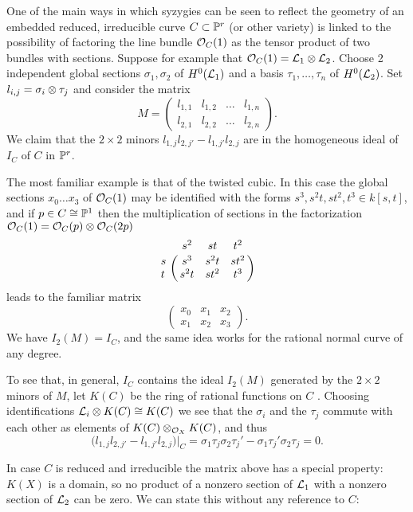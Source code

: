 One of the main ways in which syzygies can be seen to reflect the geometry of an embedded  reduced, irreducible curve $C\subset {\mathbb P}^r$
(or other variety) is linked to the possibility of factoring the line bundle ${\mathcal O}_C(1)$ as the tensor product of two bundles with sections. Suppose for example that ${\mathcal O}_C(1) = {\mathcal L}_1\otimes {\mathcal L}_2$. Choose 2 independent global sections
$\sigma_1, \sigma_2$ of  $H^0({\mathcal L}_1)$ and a basis $\tau_1,\dots, \tau_n$ of $H^0({\mathcal L}_2)$. Set
$l_{i,j}= \sigma_i\otimes \tau_j$ and consider the matrix 
$$
M = 
\begin{pmatrix}
 l_{1,1}&l_{1,2}&\dots&l_{1,n}\\
  l_{2,1}&l_{2,2}&\dots&l_{2,n}
\end{pmatrix}.
$$
We claim that  the $2\times 2$ minors $l_{1,j} l_{2,j'}-l_{1,j'}l_{2,j}$ are in the homogeneous ideal of $I_C$ of $C$ in ${\mathbb P}^r$. 

\begin{example}
The most familiar example is that of the twisted cubic. In this case the global sections $x_0\dots x_3$ of ${\mathcal O}_C(1)$ may be identified with the forms $s^3, s^2t, st^2, t^3 \in k[s,t]$, and if $p\in C \cong {\mathbb P}^1$ then the multiplication of sections
in the factorization  ${\mathcal O}_C(1) = {\mathcal O}_C(p) \otimes {\mathcal O}_C(2p)$ 
$$
\bordermatrix{
 &s^2&st&t^2\cr
 s& s^3&s^2t&st^2\cr
 t& s^2t&st^2&t^3
}
$$
 leads to the familiar matrix
$$
\begin{pmatrix}
x_0&x_1&x_2\\
x_1&x_2&x_3 
\end{pmatrix}.
$$
We have $I_2(M) = I_C$, and the same idea works for the rational normal curve of any degree.

\end{example}

To see that, in general, $I_C$ contains the ideal $I_2(M)$ generated by the $2\times 2$ minors of $M$, 
let $K(C)$ be the ring of rational functions on $C$ . Choosing identifications ${\mathcal L}_i\otimes K(C) \cong K(C)$ we see that the $\sigma_i$ and the $\tau_j$ commute with each other as elements of $K(C) \otimes_{{\mathcal O}_X} K(C)$, and thus 
$$
\bigl(l_{1,j} l_{2,j'}-l_{1,j'}l_{2,j}\bigr)|_C = \sigma_1\tau_j\sigma_2\tau_j' - \sigma_1\tau_j'\sigma_2\tau_j =0.
$$

In case $C$ is reduced and irreducible the matrix above has a special property: $K(X)$ is a domain, so no product of a nonzero
section of ${\mathcal L}_1$ with a nonzero section of ${\mathcal L}_2$ can be zero. We can state this without any reference to $C$:

